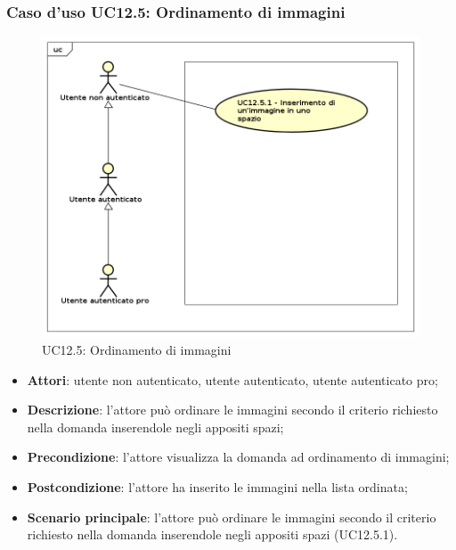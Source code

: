 \subsubsection{Caso d'uso UC12.5: Ordinamento di immagini}
\label{UC12.5}
\begin{figure}[h]
	\centering
	\includegraphics[scale=0.5]{UML/UC12_5.png}
	\caption{UC12.5: Ordinamento di immagini}
\end{figure}
\begin{itemize}
\item \textbf{Attori}: utente non autenticato, utente autenticato, utente autenticato pro;
\item \textbf{Descrizione}: l'attore può ordinare le immagini secondo il criterio richiesto nella domanda inserendole negli appositi spazi;
\item \textbf{Precondizione}: l'attore visualizza la domanda ad ordinamento di immagini;
\item \textbf{Postcondizione}: l'attore ha inserito le immagini nella lista ordinata;
\item \textbf{Scenario principale}: l'attore può ordinare le immagini secondo il criterio richiesto nella domanda inserendole negli appositi spazi (UC12.5.1).
\end{itemize}

\newpage
